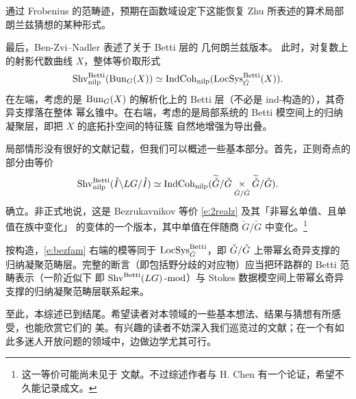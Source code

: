 	通过 Frobenius 的范畴迹，预期在函数域设定下这能恢复 Zhu \cite{zhufamilies} 所表述的算术局部
	朗兰兹猜想的某种形式。

	 最后，Ben-Zvi--Nadler \cite{benzvinadlerbetti} 表述了关于 Betti 层的
	几何朗兰兹版本。
	此时，对复数上的射影代数曲线 $X$，整体等价取形式
	\[
	  \operatorname{Shv}^{\operatorname{Betti}}_{\operatorname{nilp}}(\operatorname{Bun}_G(X)) \simeq
	  \operatorname{IndCoh}_{\operatorname{nilp}}(\operatorname{LocSys}_{\check{G}}^{\operatorname{Betti}}(X) ).
	\]
	在左端，考虑的是 $\operatorname{Bun}_G(X)$ 的解析化上的 Betti 层（不必是 ind-构造的），其奇异支撑落在整体
	幂幺锥中。在右端，考虑的是局部系统的 Betti 模空间上的归纳凝聚层，即把 $X$ 的底拓扑空间的特征簇
	自然地增强为导出叠。

	局部情形没有很好的文献记载，但我们可以概述一些基本部分。首先，正则奇点的部分由等价
	\begin{equation} \label{e:bezfam}
	      \operatorname{Shv}^{\operatorname{Betti}}_{\operatorname{nilp}}( \mathring{I}\backslash LG /
	      \mathring{I}) \simeq \operatorname{IndCoh}_{\operatorname{nilp}}( \widetilde{\check{G}} / \check{G} \underset {\check{G} /
	      \check{G}} \times \widetilde{\check{G}} / \check{G}).
	\end{equation}
	确立。非正式地说，这是 Bezrukavnikov 等价 \eqref{e:2realz} 及其「非幂幺单值、且单值在族中变化」
	的变体的一个版本，其中单值在伴随商 $\check{G} / \check{G}$ 中变化。\footnote{这一等价可能尚未见于
	文献。不过综述作者与 H. Chen 有一个论证，希望不久能记录成文。}

	按构造，\eqref{e:bezfam} 右端的模等同于 $\operatorname{LocSys}_{\check{G}}^{\operatorname{Betti}}$，即 $\check{G} / \check{G}$ 上带幂幺奇异支撑的
	归纳凝聚范畴层。完整的断言（即包括野分歧的对应物）应当把环路群的 Betti 范畴表示（一阶近似下
	即 $\operatorname{Shv}^{\operatorname{Betti}}(LG)\operatorname{-mod}$）与 Stokes 数据模空间上带幂幺奇异支撑的归纳凝聚范畴层联系起来。

	\ssszh 至此，本综述已到结尾。希望读者对本领域的一些基本想法、结果与猜想有所感受，也能欣赏它们的
	美。有兴趣的读者不妨深入我们巡览过的文献；在一个有如此多迷人开放问题的领域中，边做边学尤其可行。
